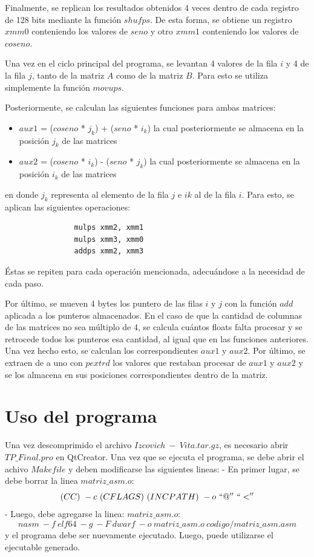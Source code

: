 \documentclass[10pt, a4paper]{article}
\begin{document}
Finalmente, se replican los resultados obtenidos 4 veces dentro de cada registro de 128 bits mediante la función $shufps$. De esta forma, se obtiene un registro $xmm0$ conteniendo los valores de $seno$ y otro $xmm1$ conteniendo los valores de $coseno$.

Una vez en el ciclo principal del programa, se levantan 4 valores de la fila $i$ y 4 de la fila $j$, tanto de la matriz $A$ como de la matriz $B$. Para esto se utiliza simplemente la función $movups$.

Posteriormente, se calculan las siguientes funciones para ambas matrices:
\begin{itemize}
\item $aux1$ = ($coseno$ * $j_k$) + ($seno$ * $i_k$) la cual posteriormente se almacena en la posición $j_k$ de las matrices
\item $aux2$ = ($coseno$ * $i_k$) - ($seno$ * $j_k$) la cual posteriormente se almacena en la posición $i_k$ de las matrices
\end{itemize}
en donde $j_k$ representa al elemento de la fila $j$ e $ik$ al de la fila $i$. 
Para esto, se aplican las siguientes operaciones:
\begin{verbatim}
                mulps xmm2, xmm1 
                mulps xmm3, xmm0
                addps xmm2, xmm3
\end{verbatim}
Éstas se repiten para cada operación mencionada, adecuándose a la necesidad de cada paso.

Por último, se mueven 4 bytes los puntero de las filas $i$ y $j$ con la función $add$ aplicada a los punteros almacenados. \newline
En el caso de que la cantidad de columnas de las matrices no sea múltiplo de 4, se calcula cuántos floats falta procesar y se retrocede todos los punteros esa cantidad, al igual que en las funciones anteriores. Una vez hecho esto, se calculan los correspondientes $aux1$ y $aux2$. Por último, se extraen de a uno con $pextrd$ los valores que restaban procesar de $aux1$ y $aux2$ y se los almacena en sus posiciones correspondientes dentro de la matriz.
\section{Uso del programa}

Una vez descomprimido el archivo $Izcovich\ -\ Vita.tar.gz$, es necesario abrir $TP\_Final.pro$ en QtCreator. Una vez que se ejecuta el programa, se debe abrir el achivo $Makefile$ y deben modificarse las siguientes lineas:\newline
- En primer lugar, se debe borrar la linea $matriz\_asm.o$:
							$$(CC)\ -c\ (CFLAGS)\ (INCPATH)\ -o\ ``@''\ ``<''$$
- Luego, debe agregarse la linea:\newline
					   $matriz\_asm.o$:
							$$nasm\ -f\ elf64\ -g\ -F\ dwarf\ -o\ matriz\_asm.o\ codigo/matriz\_asm.asm$$
y el programa debe ser nuevamente ejecutado. Luego, puede utilizarse el ejecutable generado.
\end{document}
